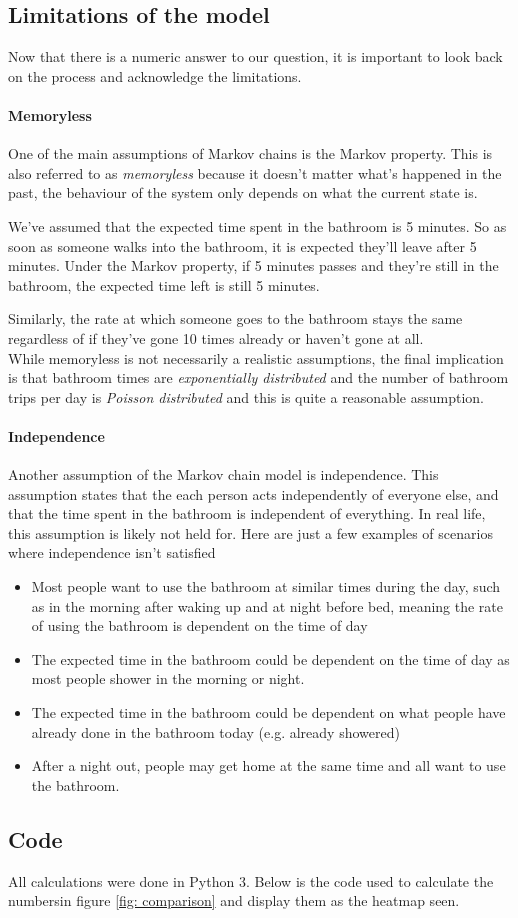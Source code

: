 \subsection*{Limitations of the model}
Now that there is a numeric answer to our question, it is important to look back on the process and acknowledge the limitations.

\paragraph{Memoryless}
One of the main assumptions of Markov chains is the Markov property. This is also referred to as \textit{memoryless} because it doesn't matter what's happened in the past, the behaviour of the system only depends on what the current state is. 

We've assumed that the expected time spent in the bathroom is 5 minutes. So as soon as someone walks into the bathroom, it is expected they'll leave after 5 minutes. Under the Markov property, if 5 minutes passes and they're still in the bathroom, the expected time left is still 5 minutes.

Similarly, the rate at which someone goes to the bathroom stays the same regardless of if they've gone 10 times already or haven't gone at all.
\\

While memoryless is not necessarily a realistic assumptions, the final implication is that bathroom times are \textit{exponentially distributed} and the number of bathroom trips per day is \textit{Poisson distributed} and this is quite a reasonable assumption.

\paragraph{Independence}
Another assumption of the Markov chain model is independence. This assumption states that the each person acts independently of everyone else, and that the time spent in the bathroom is independent of everything. In real life, this assumption is likely not held for. Here are just a few examples of scenarios where independence isn't satisfied
\begin{itemize}
	\item Most people want to use the bathroom at similar times during the day, such as in the morning after waking up and at night before bed, meaning the rate of using the bathroom is dependent on the time of day
	\item The expected time in the bathroom could be dependent on the time of day as most people shower in the morning or night.
	\item The expected time in the bathroom could be dependent on what people have already done in the bathroom today (e.g. already showered)
	\item After a night out, people may get home at the same time and all want to use the bathroom.
\end{itemize}

\subsection*{Code}
All calculations were done in Python 3. Below is the code used to calculate the numbersin figure \ref{fig: comparison} and display them as the heatmap seen.
